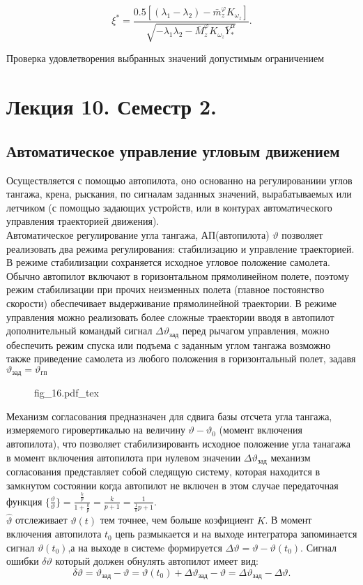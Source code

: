 \documentclass{article}
\begin{document}
\[
	\xi^* = \frac{0.5[(\lambda_1 - \lambda_2) - \bar{m}_z^\varphi K_{\omega_z}]}{\sqrt{-\lambda_1\lambda_2 - \bar{M}_z^\varphi K_{\omega_z}\bar{Y}_*^\alpha }}.
\]

Проверка удовлетворения выбранных значений допустимым ограничением

\section{Лекция 10. Семестр 2.}
\subsection{Автоматическое управление угловым движением}
Осуществляется с помощью автопилота, оно основанно на регулированиии углов тангажа, крена, рыскания, по сигналам заданных значений, вырабатываемых или летчиком (с помощью задающих устройств, или в контурах автоматического управления траекторией движения).\\ 
Автоматическое регулирование угла тангажа, АП(автопилота) $\vartheta$ позволяет реализовать два режима регулирования: стабилизацию и управление траекторией.\\ 
В режиме стабилизации сохраняется исходное угловое положение самолета. Обычно автопилот включают в горизонтальном прямолинейном полете, поэтому режим стабилизации при прочих неизменных полета (главное постоянство скорости) обеспечивает выдерживание прямолинейной траектории. В режиме управления можно реализовать более сложные траектории вводя в автопилот дополнительный командый сигнал $\Delta \vartheta_\text{зад}$ перед рычагом управления, можно обеспечить режим спуска или подъема с заданным углом тангажа возможно также приведение самолета из любого положения в горизонтальный полет, задавя $\vartheta_\text{зад} = \vartheta_\text{гп}$

\begin{figure}[ht]
	\centering
	{fig_16.pdf_tex}
\end{figure}

Механизм согласования предназначен для сдвига базы отсчета угла тангажа, измеряемого гировертикалью на величину $\vartheta - \vartheta_0$ (момент включения автопилота), что позволяет стабилизированть исходное положение угла танагажа в момент включения автопилота при нулевом значении $\Delta \vartheta_\text{зад}$ механизм согласования представляет собой следящую систему, которая находится в замкнутом состоянии когда автопилот не включен в этом случае передаточная функция $\{{\frac{\hat{\vartheta}}{\vartheta}}\}= \frac{\frac{k}{p}}{1 + \frac{k}{p}} =\frac{k}{p+1}=\frac{1}{\frac{1}{k}p + 1}$.\\
$\hat{\vartheta}$ отслеживает $\vartheta(t)$ тем точнее, чем больше коэфициент $K$. В момент включения автопилота $t_0$ цепь размыкается и на выходе интегратора запоминается сигнал $\vartheta(t_0)$,а на выходе в системe формируется $\Delta \vartheta = \vartheta - \vartheta(t_0)$. Сигнал ошибки $\delta \vartheta $ который должен обнулять автопилот имеет вид:
\[
	\delta \vartheta = \vartheta_\text{зад} - \vartheta = \vartheta(t_0) + \Delta \vartheta_\text{зад} - \vartheta = \Delta \vartheta_\text{зад} - \Delta \vartheta.
\]
\end{document}
